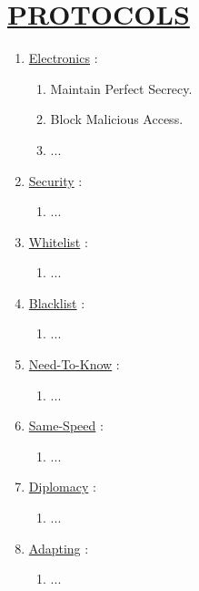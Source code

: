 \documentclass[11pt]{article}
\begin{document}
\section*{\ul{PROTOCOLS}}
\begin{enumerate}
	\item[] \ul{Electronics} :
	\begin{enumerate}
		\item[] Maintain Perfect Secrecy.
		\item[] Block Malicious Access.
		\item[] ...
	\end{enumerate}

	\item[] \ul{Security} :
	\begin{enumerate}
		\item[] ...
	\end{enumerate}

	\item[] \ul{Whitelist} :
	\begin{enumerate}
		\item[] ...
	\end{enumerate}
	
	\item[] \ul{Blacklist} :
	\begin{enumerate}
		\item[] ...
	\end{enumerate}

	\item[] \ul{Need-To-Know} :
	\begin{enumerate}
		\item[] ...
	\end{enumerate}

	\item[] \ul{Same-Speed} :
	\begin{enumerate}
		\item[] ...
	\end{enumerate}

	\item[] \ul{Diplomacy}  :
	\begin{enumerate}
		\item[] ...
	\end{enumerate}

	\item[] \ul{Adapting} :
	\begin{enumerate}
		\item[] ...
	\end{enumerate}
\end{enumerate}
\end{document}
